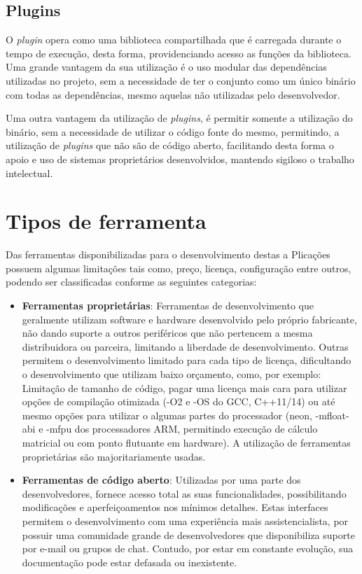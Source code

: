 
\subsection{Plugins}
O \textit{plugin} opera como uma biblioteca compartilhada que é carregada durante o tempo de execução, desta forma, providenciando acesso as funções da biblioteca. Uma grande vantagem da sua utilização é o uso modular das dependências utilizadas no projeto, sem a necessidade de ter o conjunto como um único binário com todas as dependências, mesmo aquelas não utilizadas pelo desenvolvedor.

Uma outra vantagem da utilização de \textit{plugins}, é permitir somente a utilização do binário, sem a necessidade de utilizar
o código fonte do mesmo, permitindo, a utilização de \textit{plugins} que não são de código aberto, facilitando desta
forma o apoio e uso de sistemas proprietários desenvolvidos, mantendo sigiloso o trabalho intelectual.

\section{Tipos de ferramenta}
Das ferramentas disponibilizadas para o desenvolvimento destas a Plicações possuem algumas limitações tais como, preço, licença, configuração entre outros, podendo ser classificadas conforme as seguintes categorias:

\begin{itemize}
 \item \textbf{Ferramentas proprietárias}: Ferramentas de desenvolvimento que geralmente utilizam software e hardware desenvolvido pelo próprio fabricante, não dando suporte a outros periféricos que não pertencem a mesma distribuidora ou parceira, limitando a liberdade de desenvolvimento. Outras permitem o desenvolvimento limitado para cada tipo de licença, dificultando o desenvolvimento que utilizam baixo orçamento, como, por exemplo: Limitação de tamanho de código\cite{simplicity}, pagar uma licença mais cara para utilizar opções de compilação otimizada (-O2 e -OS do GCC, C++11/14)\cite{armdeveloper} ou até mesmo opções para utilizar o algumas partes do processador (neon, -mfloat-abi e -mfpu dos processadores ARM, permitindo execução de cálculo matricial ou com ponto flutuante em hardware)\cite{neon}. A utilização de ferramentas proprietárias são majoritariamente usadas.

 \item \textbf{Ferramentas de código aberto}: Utilizadas por uma parte dos desenvolvedores, fornece acesso total as suas funcionalidades, possibilitando modificações e aperfeiçoamentos nos mínimos detalhes. Estas interfaces permitem o desenvolvimento com uma experiência mais assistencialista, por possuir uma comunidade grande de desenvolvedores que disponibiliza suporte por e-mail ou grupos de chat. Contudo, por estar em constante evolução, sua documentação pode estar defasada ou inexistente.

\end{itemize}

